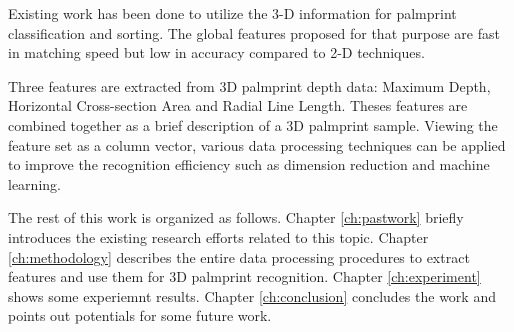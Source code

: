Existing work has been done to utilize the 3-D information for palmprint classification and sorting. The global features proposed for that purpose are fast in matching speed but low in accuracy compared to 2-D techniques.

Three features are extracted from 3D palmprint depth data: Maximum Depth, Horizontal Cross-section Area and Radial Line Length. Theses features are combined together as a brief description of a 3D palmprint sample. Viewing the feature set as a column vector, various data processing techniques can be applied to improve the recognition efficiency such as dimension reduction and machine learning.

The rest of this work is organized as follows. Chapter \ref{ch:pastwork} briefly introduces the existing research efforts related to this topic. Chapter \ref{ch:methodology} describes the entire data processing procedures to extract features and use them for 3D palmprint recognition. Chapter \ref{ch:experiment} shows some experiemnt results. Chapter \ref{ch:conclusion} concludes the work and points out potentials for some future work.
